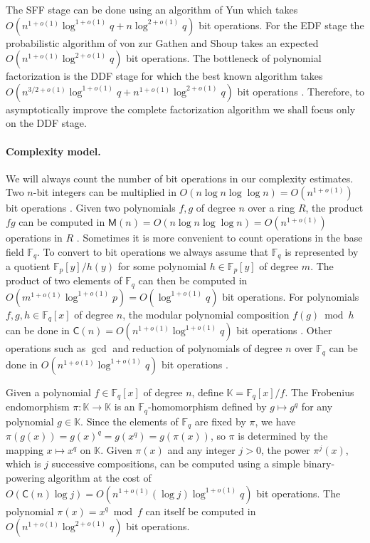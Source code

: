 \documentclass[11pt]{article}
\theoremstyle{plain}
\theoremstyle{definition}
\def\K{\ensuremath{\mathbb{K}}}
\def\F{\ensuremath{\mathbb{F}}}
\def\MM{\ensuremath{\mathsf{M}}}
\def\CC{\ensuremath{\mathsf{C}}}
\begin{document}
The SFF stage can be done using an algorithm of Yun \cite{yun1976square} which takes $O(n^{1 + 
o(1)}\log^{1 + o(1)}q + n\log^{2 + o(1)}q)$ bit operations. For the EDF stage the probabilistic 
algorithm of von zur Gathen and Shoup \cite{von1992computing} takes an expected $O(n^{1 + 
o(1)}\log^{2 + o(1)}q)$ bit operations. The bottleneck of polynomial factorization is the DDF 
stage for which the best known algorithm takes $O(n^{3/2 + o(1)}\log^{1 + o(1)}q + n^{1 + o(1)} 
\log^{2 + o(1)}q)$ bit operations \cite{kedlaya2011fast}. Therefore, to asymptotically improve the 
complete factorization algorithm we shall focus only on the DDF stage.

\paragraph{Complexity model.}
We will always count the number of bit operations in our complexity estimates. Two $n$-bit integers 
can be multiplied in $O(n\log n \log\log n) = O(n^{1 + o(1)})$ bit operations \cite{vzGG}. Given 
two polynomials $f, g$ of degree $n$ over a ring $R$, the product $fg$ can be computed in $\MM(n) = 
O(n\log n \log\log n) = O(n^{1 + o(1)})$ operations in $R$ \cite{vzGG}. Sometimes it is more 
convenient to count operations in the base field $\F_q$. To convert to bit operations we always 
assume that $\F_q$ is represented by a quotient $\F_p[y] / h(y)$ for some polynomial $h \in \F_p[y]$ 
of degree $m$. The product of two elements of $\F_q$ can then be computed in $O(m^{1 + o(1)}\log^{1 
+ o(1)}p) = O(\log^{1 + o(1)}q)$ bit operations. For polynomials $f, g, h \in \F_q[x]$ of degree 
$n$, the modular polynomial composition $f(g) \bmod h$ can be done in $\CC(n) = O(n^{1 + o(1)} 
\log^{1 + o(1)}q)$ bit operations \cite{kedlaya2011fast}. Other operations such as $\gcd$ and 
reduction of polynomials of degree $n$ over $\F_q$ can be done in $O(n^{1 + o(1)} \log^{1 + 
o(1)}q)$ bit operations \cite{vzGG}. 

Given a polynomial $f \in \F_q[x]$ of degree $n$, define $\K = \F_q[x] / f$. The Frobenius 
endomorphism $\pi: \K \rightarrow \K$ is an $\F_q$-homomorphism defined by $g \mapsto g^q$ for any 
polynomial $g \in \K$. Since the elements of $\F_q$ are fixed by $\pi$, we have $\pi(g(x)) = g(x)^q 
= g(x^q) = g(\pi(x))$, so $\pi$ is determined by the mapping $x \mapsto x^q$ on $\K$. Given $\pi(x)$ 
and any integer $j > 0$, the power $\pi^{j}(x)$, which is $j$ successive compositions, can be 
computed using a simple binary-powering algorithm at the cost of $O(\CC(n) \log j) = O(n^{1 + o(1)} 
(\log j) \log^{1 + o(1)}q)$ bit operations. The polynomial $\pi(x) = x^q \bmod f$ can itself be 
computed in $O(n^{1 + o(1)} \log^{2 + o(1)}q)$ bit operations.
\end{document}
